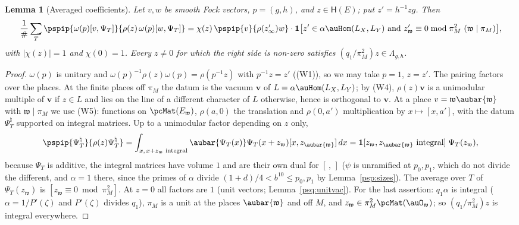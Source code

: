 \documentclass[10pt]{amsart}
\newtheorem{lemma}[theorem]{Lemma}
\theoremstyle{definition}
\theoremstyle{remark}
\providecommand{\psvac}{\mathbf v}
\begin{document}
\begin{lemma}[Averaged coefficients]\label{psp:avg}
Let $v,w$ be smooth Fock vectors, $p=(g,h)$, and $z\in\mathsf H(E)$; put $z'=h^{-1}zg$. Then
\[
\frac1\#\sum_T\pspip{\omega(p)[v,\Psi_T]}{\rho(z)\,\omega(p)[w,\Psi_T]}=\chi(z)\,\pspip{v}{\rho(z'_\infty)
w}\cdot\mathbf 1\bigl[z'\in\alpha\auHom(L_X,L_Y)\text{ and }z'_{\mathfrak w}\equiv0\bmod\pi_M^2\
(\mathfrak w\mid\pi_M)\bigr],
\]
with $|\chi(z)|=1$ and $\chi(0)=1$. Every $z\ne0$ for which the right side is non-zero satisfies
$(q_1/\pi_M^2)z\in\Lambda_{g,h}$.
\end{lemma}
\begin{proof}
$\omega(p)$ is unitary and $\omega(p)^{-1}\rho(z)\omega(p)=\rho(p^{-1}z)$ with $p^{-1}z=z'$ ((W1)), so
we may take $p=1$, $z=z'$. The pairing factors over the places. At the finite places off $\pi_M$ the
datum is the vacuum $\psvac$ of $L=\alpha\auHom(L_X,L_Y)$; by (W4), $\rho(z)\psvac$ is a unimodular
multiple of $\psvac$ if $z\in L$ and lies on the line of a different character of $L$ otherwise,
hence is orthogonal to $\psvac$. At a place $v=\mathfrak w\aubar{\mathfrak w}$ with $\mathfrak w\mid
\pi_M$ we use (W5): functions on $\pcMat(E_{\mathfrak w})$, $\rho(a,0)$ the translation and $\rho(0,a')$
multiplication by $x\mapsto[x,a']$, with the datum $\Psi_T^\natural$ supported on integral matrices.
Up to a unimodular factor depending on $z$ only,
\[
\pspip{\Psi_T^\natural}{\rho(z)\Psi_T^\natural}=\int_{x,\,x+z_{\mathfrak w}\text{ integral}}
\aubar{\Psi_T(x)}\Psi_T(x+z_{\mathfrak w})[x,z_{\aubar{\mathfrak w}}]\,dx=
\mathbf 1[z_{\mathfrak w},z_{\aubar{\mathfrak w}}\text{ integral}]\;\Psi_T(z_{\mathfrak w}),
\]
because $\Psi_T$ is additive, the integral matrices have volume $1$ and are their own dual for
$[\,,\,]$ ($\psi$ is unramified at $p_0,p_1$, which do not divide the different, and $\alpha=1$
there, since the primes of $\alpha$ divide $(1+d)/4<b^{10}\le p_0,p_1$ by Lemma~\ref{psp:sizes}). The
average over $T$ of $\Psi_T(z_{\mathfrak w})$ is $[z_{\mathfrak w}\equiv0\bmod\pi_M^2]$. At $z=0$ all
factors are $1$ (unit vectors; Lemma~\ref{psq:unitvac}). For the last assertion: $q_1\alpha$ is integral ($\alpha=1/P'(\zeta)$
and $P'(\zeta)$ divides $q_1$), $\pi_M$ is a unit at the places $\aubar{\mathfrak w}$ and off $M$,
and $z_{\mathfrak w}\in\pi_M^2\pcMat(\auO_{\mathfrak w})$; so $(q_1/\pi_M^2)z$ is integral everywhere.
\end{proof}
\end{document}
